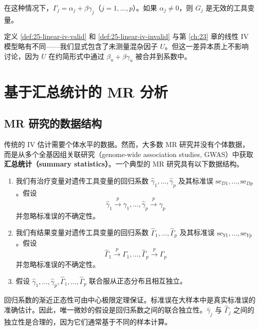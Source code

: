 在这种情况下，$\Gamma_j = \alpha_j + \beta\gamma_j$（$j = 1, \dots, p$）。如果 $\alpha_j \neq 0$，则 $G_j$ 是无效的工具变量。

\begin{Remark}
定义 \ref{def:25-linear-iv-valid} 和 \ref{def:25-linear-iv-invalid} 与第 \ref{ch:23} 章的线性 IV 模型略有不同——我们显式包含了未测量混杂因子 $U$。但这一差异本质上不影响讨论，因为 $U$ 在约简形式中通过 $\beta_u + \beta\gamma_u$ 被合并到系数中。
\end{Remark}

\section{基于汇总统计的 MR 分析}\label{sec:25-summary-statistics}

\subsection{MR 研究的数据结构}\label{sec:25-data-structure}

传统的 IV 估计需要个体水平的数据。然而，大多数 MR 研究并没有个体数据，而是从多个全基因组关联研究（genome-wide association studies, GWAS）中获取\textbf{汇总统计（summary statistics）}。一个典型的 MR 研究具有以下数据结构。

\begin{Assumption}[基于汇总统计的 MR 研究]\label{asm:25-summary-data}
\begin{enumerate}
  \item 我们有治疗变量对遗传工具变量的回归系数 $\hat\gamma_1, \dots, \hat\gamma_p$ 及其标准误 $\mathrm{se}_{D1}, \dots, \mathrm{se}_{Dp}$。假设
  \[
  \hat\gamma_1 \xrightarrow{p} \gamma_1, \dots, \hat\gamma_p \xrightarrow{p} \gamma_p \tag{25.9}
  \]
  并忽略标准误的不确定性。

  \item 我们有结果变量对遗传工具变量的回归系数 $\hat\Gamma_1, \dots, \hat\Gamma_p$ 及其标准误 $\mathrm{se}_{Y1}, \dots, \mathrm{se}_{Yp}$。假设
  \[
  \hat\Gamma_1 \xrightarrow{p} \Gamma_1, \dots, \hat\Gamma_p \xrightarrow{p} \Gamma_p \tag{25.10}
  \]
  并忽略标准误的不确定性。

  \item 假设 $\hat\gamma_1, \dots, \hat\gamma_p, \hat\Gamma_1, \dots, \hat\Gamma_p$ 联合服从正态分布且相互独立。
\end{enumerate}
\end{Assumption}

回归系数的渐近正态性可由中心极限定理保证。标准误在大样本中是真实标准误的准确估计。因此，唯一微妙的假设是回归系数之间的联合独立性。$\hat\gamma_j$ 与 $\hat\Gamma_j$ 之间的独立性是合理的，因为它们通常基于不同的样本计算。

